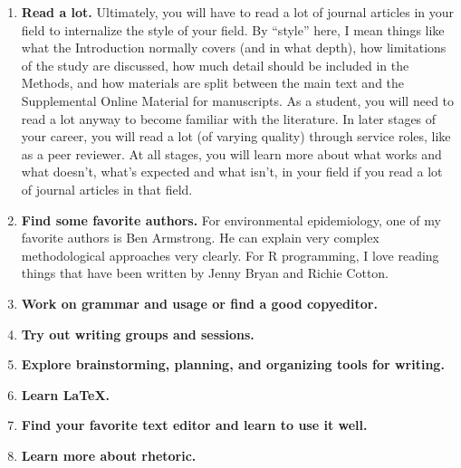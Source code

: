 \documentclass[]{tufte-book}
\providecommand{\tightlist}{%
  \setlength{\itemsep}{0pt}\setlength{\parskip}{0pt}}
\begin{document}
\begin{enumerate}
\def\labelenumi{\arabic{enumi}.}
\tightlist
\item
  \textbf{Read a lot.} Ultimately, you will have to read a lot of journal articles in your
  field to internalize the style of your field. By ``style'' here, I mean things like
  what the Introduction normally covers (and in what depth), how limitations of the
  study are discussed, how much detail should be included in the Methods, and how
  materials are split between the main text and the Supplemental Online Material for
  manuscripts. As a student, you will need to read a lot anyway to become familiar with
  the literature. In later stages of your career, you will read a lot (of varying quality)
  through service roles, like as a peer reviewer. At all stages, you will learn more about
  what works and what doesn't, what's expected and what isn't, in your field if you read
  a lot of journal articles in that field.
\item
  \textbf{Find some favorite authors.}
  For environmental epidemiology, one of my favorite authors is Ben Armstrong. He can
  explain very complex methodological approaches very clearly. For R programming, I love
  reading things that have been written by Jenny Bryan and Richie Cotton.
\item
  \textbf{Work on grammar and usage or find a good copyeditor.}
\item
  \textbf{Try out writing groups and sessions.}
\item
  \textbf{Explore brainstorming, planning, and organizing tools for writing.}
\item
  \textbf{Learn LaTeX.}
\item
  \textbf{Find your favorite text editor and learn to use it well.}
\item
  \textbf{Learn more about rhetoric.}
\end{enumerate}


\end{document}
